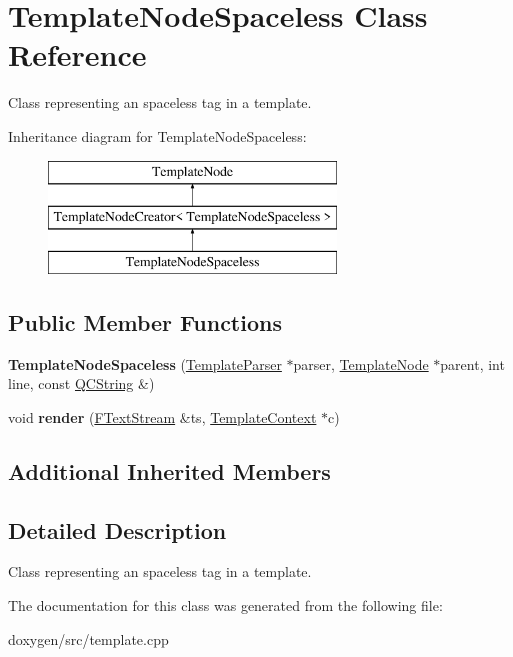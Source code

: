 \hypertarget{class_template_node_spaceless}{}\section{Template\+Node\+Spaceless Class Reference}
\label{class_template_node_spaceless}


Class representing an \textquotesingle{}spaceless\textquotesingle{} tag in a template.  


Inheritance diagram for Template\+Node\+Spaceless\+:\begin{figure}[H]
\begin{center}
\leavevmode
\includegraphics[height=3.000000cm]{class_template_node_spaceless}
\end{center}
\end{figure}
\subsection*{Public Member Functions}
\begin{DoxyCompactItemize}
\item 
\mbox{\label{class_template_node_spaceless_a28140e5a4e0e5da21352996866316a71}} 
{\bfseries Template\+Node\+Spaceless} (\mbox{\hyperlink{class_template_parser}{Template\+Parser}} $\ast$parser, \mbox{\hyperlink{class_template_node}{Template\+Node}} $\ast$parent, int line, const \mbox{\hyperlink{class_q_c_string}{Q\+C\+String}} \&)
\item 
\mbox{\label{class_template_node_spaceless_ae50d34987b7474cdef27f3a2ebce8b3a}} 
void {\bfseries render} (\mbox{\hyperlink{class_f_text_stream}{F\+Text\+Stream}} \&ts, \mbox{\hyperlink{class_template_context}{Template\+Context}} $\ast$c)
\end{DoxyCompactItemize}
\subsection*{Additional Inherited Members}


\subsection{Detailed Description}
Class representing an \textquotesingle{}spaceless\textquotesingle{} tag in a template. 

The documentation for this class was generated from the following file\+:\begin{DoxyCompactItemize}
\item 
doxygen/src/template.\+cpp\end{DoxyCompactItemize}
